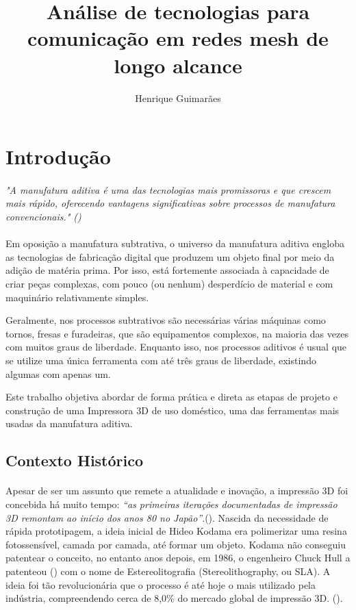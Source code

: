 \documentclass[12pt, english]{article}
\title{Análise de tecnologias para comunicação em redes mesh de longo alcance}
\author{Henrique Guimarães}
\begin{document}
\tableofcontents

\listoffigures
\pagebreak
\listoftables
\pagebreak

\section{Introdução}
\paragraph{} 

\begin{tab}{1cm}{1cm} 
	\emph{
		"A manufatura aditiva é uma das tecnologias mais promissoras e que crescem mais rápido, oferecendo vantagens significativas sobre processos de manufatura convencionais." (\cite{Bikas2019})
		}
\end{tab} 

\paragraph{}
Em oposição a manufatura subtrativa, o universo da manufatura aditiva engloba as tecnologias de fabricação digital que produzem um objeto final por meio da adição de matéria prima. Por isso, está fortemente associada à capacidade de criar peças complexas, com pouco (ou nenhum) desperdício de material e com maquinário relativamente simples. 

Geralmente, nos processos subtrativos são necessárias várias máquinas como tornos, fresas e furadeiras, que são equipamentos complexos, na maioria das vezes com muitos graus de liberdade. Enquanto isso, nos processos aditivos é usual que se utilize uma única ferramenta com até três graus de liberdade, existindo algumas com apenas um.

Este trabalho objetiva abordar de forma prática e direta as etapas de projeto e construção de uma Impressora 3D de uso doméstico, uma das ferramentas mais usadas da manufatura aditiva. 


\subsection{Contexto Histórico}

\paragraph{}
Apesar de ser um assunto que remete a atualidade e inovação, a impressão 3D foi concebida há muito tempo: \emph{“as primeiras iterações documentadas de impressão 3D remontam ao início dos anos 80 no Japão”}.(\cite{BCN3D}). Nascida da necessidade de rápida prototipagem, a ideia inicial de Hideo Kodama era polimerizar uma resina fotossensível, camada por camada, até formar um objeto. Kodama não conseguiu patentear o conceito, no entanto anos depois, em 1986, o engenheiro Chuck Hull a patenteou  (\cite{Hull1984}) com o nome de Estereolitografia (Stereolithography, ou SLA). A ideia foi tão revolucionária que o processo é até hoje o mais utilizado pela indústria, compreendendo cerca de 8,0\% do mercado global de impressão 3D.     (\cite{GRV2022}).
\end{document}
